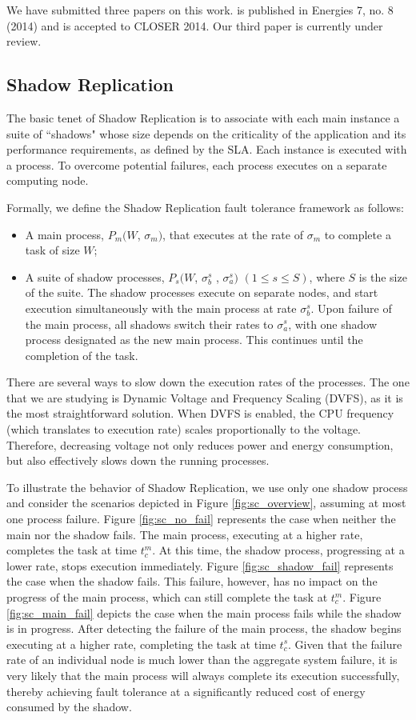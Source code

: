 We have submitted three papers on this work. \cite{cui_en7085151} is published in Energies 7, no. 8 (2014) and \cite{cui_closer_2014} is accepted to CLOSER 2014. Our third paper is currently under review.

\subsection{Shadow Replication}
The basic tenet of Shadow Replication is to associate with each main instance a suite of ``shadows" whose size depends on the criticality of the application and its performance requirements, as defined by the SLA. Each instance is executed with a process. 
To overcome potential failures, each process
executes on a separate computing node.

Formally, we define the Shadow Replication fault tolerance framework as follows:
\begin{itemize}
	\item A main process, $P_m(W$, $\sigma_m)$, that executes at the rate of $\sigma_m$ to complete a task of size $W$;
	\item A suite of shadow processes, $P_s(W$, $\sigma_b^s$ , $\sigma_a^s)$ $(1 \le s \le S)$, where $S$ is the size of the suite. The shadow processes execute on separate nodes, and start execution simultaneously with the main process at rate $\sigma_b^s$. Upon failure of the main process, all shadows switch their rates to $\sigma_a^s$, with one shadow process designated as the new main process. This continues until the completion of the task.
\end{itemize}

There are several ways to slow down the execution rates of the processes. The one that we are studying is Dynamic Voltage and Frequency Scaling (DVFS), as it is the most straightforward solution. When DVFS is enabled, the CPU frequency (which translates to execution rate) scales proportionally to the voltage. Therefore, decreasing voltage not only reduces power and energy consumption, but also effectively slows down the running processes. 

To illustrate the behavior of Shadow Replication, we use only one shadow process and consider the scenarios depicted in Figure \ref{fig:sc_overview}, assuming at most one process failure. Figure \ref{fig:sc_no_fail} represents the case when neither the main nor the shadow fails. The main process, executing
at a higher rate, completes the task at time $t_c^m$. At this time, the shadow process, progressing at a lower rate, stops execution immediately. Figure \ref{fig:sc_shadow_fail} represents the case when the shadow fails. This failure, however, has no impact on the progress of the main process, which can still complete the task at $t_c^m$. Figure \ref{fig:sc_main_fail} depicts the case when the main process fails while the shadow is in progress. After detecting the failure of the main process, the shadow begins executing at a higher rate, completing the task at time $t_c^s$. Given that the failure rate of an individual node is much lower than
the aggregate system failure, it is very likely that the main process
will always complete its execution successfully, thereby achieving fault tolerance at a significantly reduced cost of energy consumed by the shadow. 

